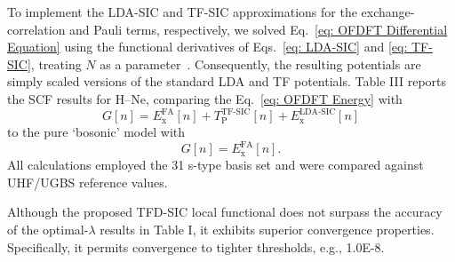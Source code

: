 \documentclass[%
 reprint,
 amsmath,amssymb,
 aps,
pra,
]{revtex4-2}
\begin{document}
To implement the LDA-SIC and TF-SIC approximations for the exchange-correlation and Pauli terms, respectively, we solved Eq.~\eqref{eq: OFDFT Differential Equation} using the functional derivatives of Eqs.~\eqref{eq: LDA-SIC} and \eqref{eq: TF-SIC}, treating $N$ as a parameter~\cite{Bosko.2025.JCP.163.054108,Tozer.1997.PRA.56.2726}. Consequently, the resulting potentials are simply scaled versions of the standard LDA and TF potentials. Table III reports the SCF results for H--Ne, comparing the Eq.~\eqref{eq: OFDFT Energy} with 
\begin{equation}\label{eq: TFD-SIC}
    G[n]
    =
    E_{\text{x}}^{\text{FA}}[n]
    + 
    T^{\text{TF-SIC}}_{\text{P}}[n] 
    + 
    E^{\text{LDA-SIC}}_{\text{x}}[n]
\end{equation}
to the pure `bosonic' model with 
\begin{equation}\label{eq: WFA}
    G[n]
    =
    E_{\text{x}}^{\text{FA}}[n].
\end{equation}
All calculations employed the 31 s-type basis set and were compared against UHF/UGBS reference values.

Although the proposed TFD-SIC local functional does not surpass the accuracy of the optimal-$\lambda$ results in Table I, it exhibits superior convergence properties. Specifically, it permits convergence to tighter thresholds, e.g., 1.0E-8. 


\end{document}
